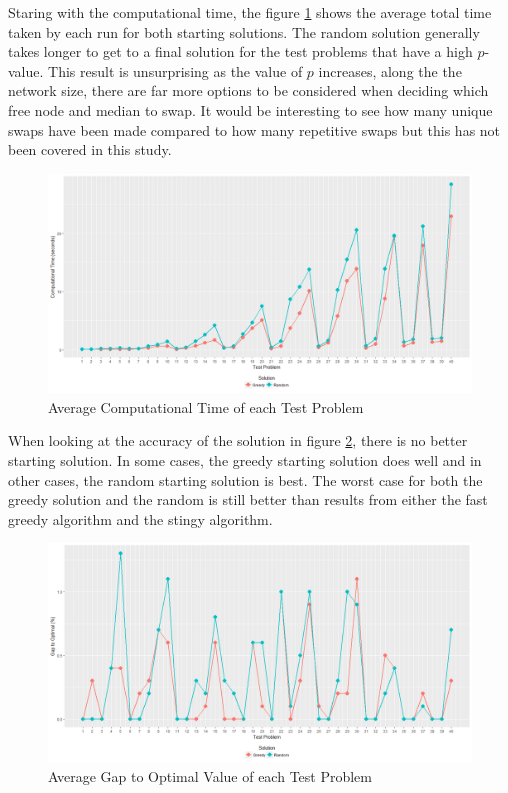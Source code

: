 \documentclass[11pt]{article}
\begin{document}
	Staring with the computational time, the figure \ref{TBtime} shows the average total time taken by each run for both starting solutions.  The random solution generally takes longer to get to a final solution for the test problems that have a high $p$-value.  This result is unsurprising as the value of $p$ increases, along the the network size, there are far more options to be considered when deciding which free node and median to swap.  It would be interesting to see how many unique swaps have been made compared to how many repetitive swaps but this has not been covered in this study.
		
		\begin{figure}[H]
			\begin{center}
				\includegraphics[width=14cm]{TBtime.png}
				\caption{Average Computational Time of each Test Problem}
				\label{TBtime}
			\end{center}
		\end{figure}
	
	When looking at the accuracy of the solution in figure \ref{TBgap}, there is no better starting solution.  In some cases, the greedy starting solution does well and in other cases, the random starting solution is best.  The worst case for both the greedy solution and the random is still better than results from either the fast greedy algorithm and the stingy algorithm.
		
		\begin{figure}[H]
			\begin{center}
				\includegraphics[width=14cm]{TBgap.png}
				\caption{Average Gap to Optimal Value of each Test Problem}
				\label{TBgap}
			\end{center}
		\end{figure}
		
\end{document}
